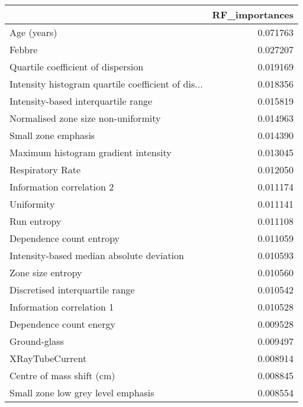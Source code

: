 \centering
\begin{longtable}{|lr|}
\toprule
{} &  RF\_importances \\
\midrule
Age (years)                                        &        0.071763 \\
Febbre                                             &        0.027207 \\
Quartile coefficient of dispersion                 &        0.019169 \\
Intensity histogram quartile coefficient of dis... &        0.018356 \\
Intensity-based interquartile range                &        0.015819 \\
Normalised zone size non-uniformity                &        0.014963 \\
Small zone emphasis                                &        0.014390 \\
Maximum histogram gradient intensity               &        0.013045 \\
Respiratory Rate                                   &        0.012050 \\
Information correlation 2                          &        0.011174 \\
Uniformity                                         &        0.011141 \\
Run entropy                                        &        0.011108 \\
Dependence count entropy                           &        0.011059 \\
Intensity-based median absolute deviation          &        0.010593 \\
Zone size entropy                                  &        0.010560 \\
Discretised interquartile range                    &        0.010542 \\
Information correlation 1                          &        0.010528 \\
Dependence count energy                            &        0.009528 \\
Ground-glass                                       &        0.009497 \\
XRayTubeCurrent                                    &        0.008914 \\
Centre of mass shift (cm)                          &        0.008845 \\
Small zone low grey level emphasis                 &        0.008554 \\

\end{longtable}
